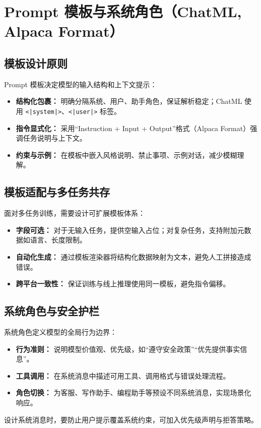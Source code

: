 \documentclass[UTF8,zihao=-4]{ctexart}
\begin{document}
\section{Prompt 模板与系统角色（ChatML, Alpaca Format）}
\subsection{模板设计原则}
Prompt 模板决定模型的输入结构和上下文提示：
\begin{itemize}
  \item \textbf{结构化包裹：} 明确分隔系统、用户、助手角色，保证解析稳定；ChatML 使用 \texttt{<|system|>}、\texttt{<|user|>} 标签。
  \item \textbf{指令显式化：} 采用“Instruction + Input + Output”格式（Alpaca Format）强调任务说明与上下文。
  \item \textbf{约束与示例：} 在模板中嵌入风格说明、禁止事项、示例对话，减少模糊理解。
\end{itemize}

\subsection{模板适配与多任务共存}
面对多任务训练，需要设计可扩展模板体系：
\begin{itemize}
  \item \textbf{字段可选：} 对于无输入任务，提供空输入占位；对复杂任务，支持附加元数据如语言、长度限制。
  \item \textbf{自动化生成：} 通过模板渲染器将结构化数据映射为文本，避免人工拼接造成错误。
  \item \textbf{跨平台一致性：} 保证训练与线上推理使用同一模板，避免指令偏移。
\end{itemize}

\subsection{系统角色与安全护栏}
系统角色定义模型的全局行为边界：
\begin{itemize}
  \item \textbf{行为准则：} 说明模型价值观、优先级，如“遵守安全政策”“优先提供事实信息”。
  \item \textbf{工具调用：} 在系统消息中描述可用工具、调用格式与错误处理流程。
  \item \textbf{角色切换：} 为客服、写作助手、编程助手等预设不同系统消息，实现场景化响应。
\end{itemize}
设计系统消息时，要防止用户提示覆盖系统约束，可加入优先级声明与拒答策略。
\end{document}
